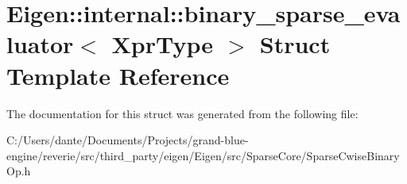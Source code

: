 \hypertarget{struct_eigen_1_1internal_1_1binary__sparse__evaluator}{}\section{Eigen\+::internal\+::binary\+\_\+sparse\+\_\+evaluator$<$ Xpr\+Type $>$ Struct Template Reference}
\label{struct_eigen_1_1internal_1_1binary__sparse__evaluator}


The documentation for this struct was generated from the following file\+:\begin{DoxyCompactItemize}
\item 
C\+:/\+Users/dante/\+Documents/\+Projects/grand-\/blue-\/engine/reverie/src/third\+\_\+party/eigen/\+Eigen/src/\+Sparse\+Core/Sparse\+Cwise\+Binary\+Op.\+h\end{DoxyCompactItemize}
